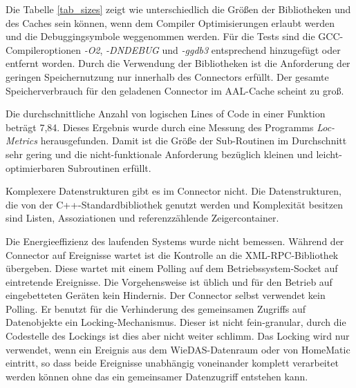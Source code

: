 Die Tabelle \ref{tab_sizes} zeigt wie unterschiedlich die Größen der Bibliotheken und des Caches
sein können, wenn dem Compiler Optimisierungen erlaubt werden und die Debuggingsymbole weggenommen werden.
Für die Tests sind die GCC-Compileroptionen \emph{-O2}, \emph{-DNDEBUG} und \emph{-ggdb3} entsprechend
hinzugefügt oder entfernt worden.
Durch die Verwendung der Bibliotheken ist die Anforderung der geringen Speichernutzung nur
innerhalb des Connectors erfüllt.
Der gesamte Speicherverbrauch für den geladenen Connector im AAL-Cache scheint zu groß.

Die durchschnittliche Anzahl von logischen Lines of Code in einer Funktion beträgt 7,84.
Dieses Ergebnis wurde durch eine Messung des Programms \emph{Loc-Metrics} \cite{locmetrics}
herausgefunden.
Damit ist die Größe der Sub-Routinen im Durchschnitt sehr gering und die nicht-funktionale Anforderung
bezüglich kleinen und leicht-optimierbaren Subroutinen erfüllt.

Komplexere Datenstrukturen gibt es im Connector nicht.
Die Datenstrukturen, die von der C++-Standardbibliothek genutzt werden und Komplexität besitzen sind
Listen, Assoziationen und referenzzählende Zeigercontainer.

Die Energieeffizienz des laufenden Systems wurde nicht bemessen.
Während der Connector auf Ereignisse wartet ist die Kontrolle an die XML-RPC-Bibliothek übergeben.
Diese wartet mit einem Polling auf dem Betriebssystem-Socket auf eintretende Ereignisse.
Die Vorgehensweise ist üblich und für den Betrieb auf eingebetteten Geräten kein Hindernis.
Der Connector selbst verwendet kein Polling.
Er benutzt für die Verhinderung des gemeinsamen Zugriffs auf Datenobjekte ein Locking-Mechanismus.
Dieser ist nicht fein-granular, durch die Codestelle des Lockings ist dies aber nicht weiter schlimm.
Das Locking wird nur verwendet, wenn ein Ereignis aus dem WieDAS-Datenraum oder von HomeMatic eintritt, so
dass beide Ereignisse unabhängig voneinander komplett verarbeitet werden können ohne das ein gemeinsamer
Datenzugriff entstehen kann.

